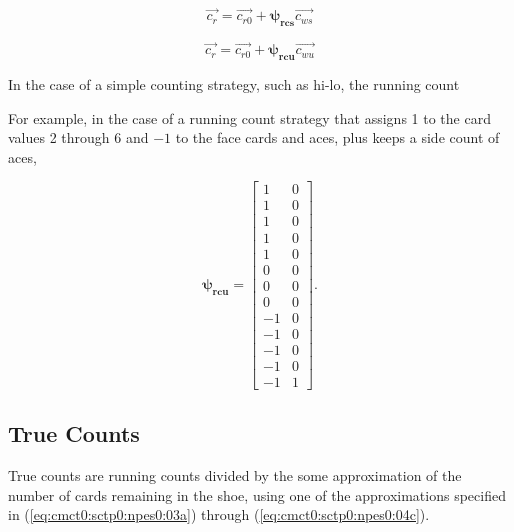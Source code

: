 \begin{equation}
\label{eq:cmct0:sctp0:srct0:01a}
\overrightarrow{c_{r}}
=
\overrightarrow{c_{r0}} +
\boldsymbol{\psi_{rcs}} \overrightarrow{c_{ws}}
\end{equation}

\begin{equation}
\label{eq:cmct0:sctp0:srct0:01b}
\overrightarrow{c_{r}}
=
\overrightarrow{c_{r0}} +
\boldsymbol{\psi_{rcu}} \overrightarrow{c_{wu}}
\end{equation}


In the case of a simple counting strategy, such as hi-lo, the running count


For example, in the case of a running count strategy that assigns 1 to the card
values 2 through 6 and $-1$ to the face cards and aces, plus keeps a side count of aces,

\begin{equation}
\label{eq:cmct0:sctp0:srct0:02}
\boldsymbol{\psi_{rcu}}
=
\left[ \begin{array}{cc}
 1 & 0     \\
 1 & 0     \\
 1 & 0     \\
 1 & 0     \\
 1 & 0     \\
 0 & 0     \\
 0 & 0     \\
 0 & 0     \\
-1 & 0     \\
-1 & 0     \\
-1 & 0     \\
-1 & 0     \\
-1 & 1
\end{array}\right].
\end{equation}


\subsection{True Counts}
\label{cmct0:sctp0:strc0}

True counts are running counts divided by the some approximation of the 
number of cards remaining
in the shoe, using one of the approximations specified
in (\ref{eq:cmct0:sctp0:npes0:03a}) through (\ref{eq:cmct0:sctp0:npes0:04c}).

